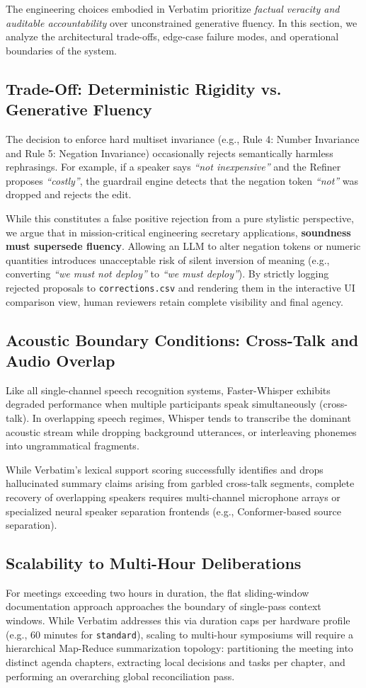\documentclass[10pt,a4paper]{article}
\begin{document}
The engineering choices embodied in Verbatim prioritize \textit{factual veracity and auditable accountability} over unconstrained generative fluency. In this section, we analyze the architectural trade-offs, edge-case failure modes, and operational boundaries of the system.

\subsection{Trade-Off: Deterministic Rigidity vs. Generative Fluency}
The decision to enforce hard multiset invariance (e.g., Rule 4: Number Invariance and Rule 5: Negation Invariance) occasionally rejects semantically harmless rephrasings. For example, if a speaker says \textit{``not inexpensive''} and the Refiner proposes \textit{``costly''}, the guardrail engine detects that the negation token \textit{``not''} was dropped and rejects the edit. 

While this constitutes a false positive rejection from a pure stylistic perspective, we argue that in mission-critical engineering secretary applications, \textbf{soundness must supersede fluency}. Allowing an LLM to alter negation tokens or numeric quantities introduces unacceptable risk of silent inversion of meaning (e.g., converting \textit{``we must not deploy''} to \textit{``we must deploy''}). By strictly logging rejected proposals to \texttt{corrections.csv} and rendering them in the interactive UI comparison view, human reviewers retain complete visibility and final agency.

\subsection{Acoustic Boundary Conditions: Cross-Talk and Audio Overlap}
Like all single-channel speech recognition systems, Faster-Whisper exhibits degraded performance when multiple participants speak simultaneously (cross-talk). In overlapping speech regimes, Whisper tends to transcribe the dominant acoustic stream while dropping background utterances, or interleaving phonemes into ungrammatical fragments. 

While Verbatim's lexical support scoring successfully identifies and drops hallucinated summary claims arising from garbled cross-talk segments, complete recovery of overlapping speakers requires multi-channel microphone arrays or specialized neural speaker separation frontends (e.g., Conformer-based source separation).

\subsection{Scalability to Multi-Hour Deliberations}
For meetings exceeding two hours in duration, the flat sliding-window documentation approach approaches the boundary of single-pass context windows. While Verbatim addresses this via duration caps per hardware profile (e.g., 60 minutes for \texttt{standard}), scaling to multi-hour symposiums will require a hierarchical Map-Reduce summarization topology: partitioning the meeting into distinct agenda chapters, extracting local decisions and tasks per chapter, and performing an overarching global reconciliation pass.
\end{document}
